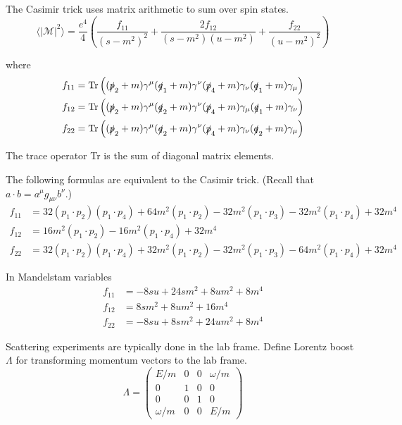 The Casimir trick uses matrix arithmetic to sum over spin states.
\begin{equation*}
\langle|\mathcal{M}|^2\rangle
=
\frac{e^4}{4}
\left(
\frac{f_{11}}{(s-m^2)^2}
+\frac{2f_{12}}{(s-m^2)(u-m^2)}
+\frac{f_{22}}{(u-m^2)^2}
\right)
\tag{1}
\end{equation*}

where
\begin{align*}
f_{11}&=\operatorname{Tr}
\left(
(\slashed{p}_2+m)\gamma^\mu(\slashed{q}_1+m)\gamma^\nu(\slashed{p}_4+m)\gamma_\nu(\slashed{q}_1+m)\gamma_\mu
\right)
\\
f_{12}&=\operatorname{Tr}
\left(
(\slashed{p}_2+m)\gamma^\mu(\slashed{q}_2+m)\gamma^\nu(\slashed{p}_4+m)\gamma_\mu(\slashed{q}_1+m)\gamma_\nu
\right)
\\
f_{22}&=\operatorname{Tr}
\left(
(\slashed{p}_2+m)\gamma^\mu(\slashed{q}_2+m)\gamma^\nu(\slashed{p}_4+m)\gamma_\nu(\slashed{q}_2+m)\gamma_\mu
\right)
\end{align*}

The trace operator Tr is the sum of diagonal matrix elements.

\bigskip
The following formulas are equivalent to the Casimir trick.
(Recall that $a\cdot b=a^\mu g_{\mu\nu}b^\nu$.)
\begin{equation*}
\begin{aligned}
f_{11}&=
 32 (p_1 \cdot p_2) (p_1 \cdot p_4) +
 64 m^2 (p_1 \cdot p_2) -
 32 m^2 (p_1 \cdot p_3) -
 32 m^2 (p_1 \cdot p_4) + 32 m^4
\\
f_{12}&=16 m^2 (p_1 \cdot p_2) - 16 m^2 (p_1 \cdot p_4) + 32m^4
\\
f_{22}&=
32 (p_1 \cdot p_2) (p_1 \cdot p_4) +
32 m^2 (p_1 \cdot p_2) -
32 m^2 (p_1 \cdot p_3) -
64 m^2 (p_1 \cdot p_4) + 32 m^4
\end{aligned}
\tag{2}
\end{equation*}

In Mandelstam variables
\begin{equation*}
\begin{aligned}
f_{11}&=-8 s u + 24 s m^2 + 8 u m^2 + 8 m^4
\\
f_{12}&=8 s m^2 + 8 u m^2 + 16 m^4
\\
f_{22}&=-8 s u + 8 s m^2 + 24 u m^2 + 8 m^4
\end{aligned}
\tag{3}
\end{equation*}

Scattering experiments are typically done in the lab frame.
Define Lorentz boost $\Lambda$ for transforming momentum vectors to the lab frame.
\begin{equation*}
\Lambda=
\begin{pmatrix}
E/m & 0 & 0 & \omega/m\\
0 & 1 & 0 & 0\\
0 & 0 & 1 & 0\\
\omega/m & 0 & 0 & E/m
\end{pmatrix}
\end{equation*}

